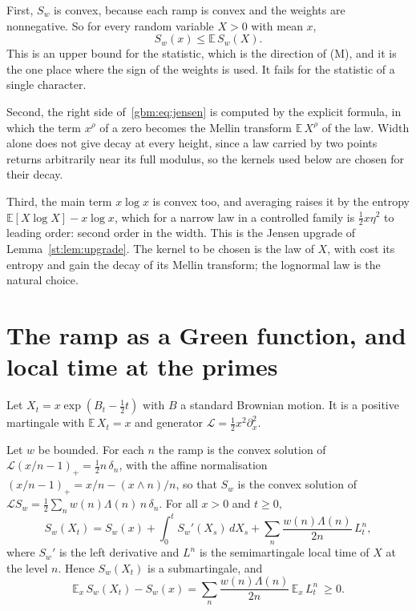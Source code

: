 First, $S_w$ is convex, because each ramp is convex and the weights are nonnegative. So for every random variable $X>0$ with mean $x$,
\begin{equation}\label{gbm:eq:jensen}
S_w(x)\le\mathbb E\,S_w(X).
\end{equation}
This is an upper bound for the statistic, which is the direction of (M), and it is the one place where the sign of the weights is used. It fails for the statistic of a single character.

Second, the right side of~\eqref{gbm:eq:jensen} is computed by the explicit formula, in which the term $x^\rho$ of a zero becomes the Mellin transform $\mathbb E\,X^\rho$ of the law. Width alone does not give decay at every height, since a law carried by two points returns arbitrarily near its full modulus, so the kernels used below are chosen for their decay.

Third, the main term $x\log x$ is convex too, and averaging raises it by the entropy $\mathbb E[X\log X]-x\log x$, which for a narrow law in a controlled family is $\frac12x\eta^2$ to leading order: second order in the width. This is the Jensen upgrade of Lemma~\ref{st:lem:upgrade}. The kernel to be chosen is the law of $X$, with cost its entropy and gain the decay of its Mellin transform; the lognormal law is the natural choice.

\section{The ramp as a Green function, and local time at the primes}\label{gbm:sec:local}

Let $X_t=x\exp(B_t-\frac12t)$ with $B$ a standard Brownian motion. It is a positive martingale with $\mathbb E\,X_t=x$ and generator $\mathcal L=\frac12x^2\partial_x^2$.

\begin{theorem}\label{gbm:thm:tanaka}
Let $w$ be bounded. For each $n$ the ramp is the convex solution of $\mathcal L(x/n-1)_+=\frac12n\,\delta_n$, with the affine normalisation $(x/n-1)_+=x/n-(x\wedge n)/n$, so that $S_w$ is the convex solution of $\mathcal LS_w=\frac12\sum_nw(n)\Lambda(n)\,n\,\delta_n$. For all $x>0$ and $t\ge0$,
\[
S_w(X_t)=S_w(x)+\int_0^tS_w'(X_s)\,dX_s+\sum_n\frac{w(n)\Lambda(n)}{2n}\,L^n_t,
\]
where $S_w'$ is the left derivative and $L^n$ is the semimartingale local time of $X$ at the level $n$. Hence $S_w(X_t)$ is a submartingale, and
\[
\mathbb E_x\,S_w(X_t)-S_w(x)=\sum_n\frac{w(n)\Lambda(n)}{2n}\,\mathbb E_x\,L^n_t\ \ge0 .
\]
\end{theorem}

